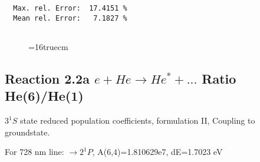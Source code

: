 \documentclass[12pt]{article}
\begin{document}
\begin{small}
\begin{verbatim}
  Max. rel. Error:  17.4151 %
  Mean rel. Error:   7.1827 %


\end{verbatim}\end{small}
\begin{figure} \label{2.1.8lr2o}
\epsfxsize=16truecm
\end{figure}
\newpage



\subsection{
  Reaction 2.2a $e + He \rightarrow He^* + ... $ Ratio He(6)/He(1)
}

  $3^1S$ state
  reduced population coefficients, formulation II,
  Coupling to groundstate.

  For 728 nm line:  $\rightarrow 2^1P$, A(6,4)=1.810629e7, dE=1.7023 eV
\end{document}
